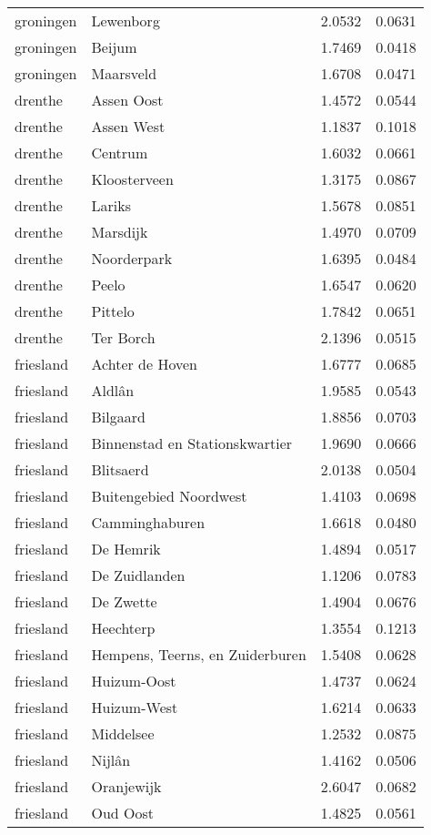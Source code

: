 \begin{longtable}{llcc}
groningen & Lewenborg & 2.0532 & 0.0631 \\
groningen & Beijum & 1.7469 & 0.0418 \\
groningen & Maarsveld & 1.6708 & 0.0471 \\
drenthe & Assen Oost & 1.4572 & 0.0544 \\
drenthe & Assen West & 1.1837 & 0.1018 \\
drenthe & Centrum & 1.6032 & 0.0661 \\
drenthe & Kloosterveen & 1.3175 & 0.0867 \\
drenthe & Lariks & 1.5678 & 0.0851 \\
drenthe & Marsdijk & 1.4970 & 0.0709 \\
drenthe & Noorderpark & 1.6395 & 0.0484 \\
drenthe & Peelo & 1.6547 & 0.0620 \\
drenthe & Pittelo & 1.7842 & 0.0651 \\
drenthe & Ter Borch & 2.1396 & 0.0515 \\
friesland & Achter de Hoven & 1.6777 & 0.0685 \\
friesland & Aldlân & 1.9585 & 0.0543 \\
friesland & Bilgaard & 1.8856 & 0.0703 \\
friesland & Binnenstad en Stationskwartier & 1.9690 & 0.0666 \\
friesland & Blitsaerd & 2.0138 & 0.0504 \\
friesland & Buitengebied Noordwest & 1.4103 & 0.0698 \\
friesland & Camminghaburen & 1.6618 & 0.0480 \\
friesland & De Hemrik & 1.4894 & 0.0517 \\
friesland & De Zuidlanden & 1.1206 & 0.0783 \\
friesland & De Zwette & 1.4904 & 0.0676 \\
friesland & Heechterp & 1.3554 & 0.1213 \\
friesland & Hempens, Teerns, en Zuiderburen & 1.5408 & 0.0628 \\
friesland & Huizum-Oost & 1.4737 & 0.0624 \\
friesland & Huizum-West & 1.6214 & 0.0633 \\
friesland & Middelsee & 1.2532 & 0.0875 \\
friesland & Nijlân & 1.4162 & 0.0506 \\
friesland & Oranjewijk & 2.6047 & 0.0682 \\
friesland & Oud Oost & 1.4825 & 0.0561 \\

\end{longtable}
